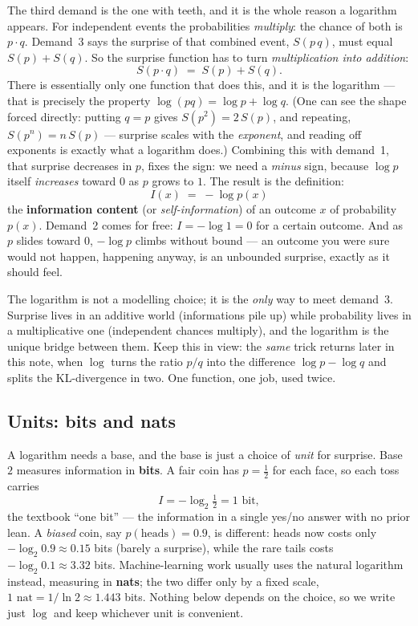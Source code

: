 \documentclass[11pt]{article}
\begin{document}
The third demand is the one with teeth, and it is the whole reason a logarithm appears. For
independent events the probabilities \emph{multiply}: the chance of both is $p \cdot q$. Demand~3
says the surprise of that combined event, $S(p\,q)$, must equal $S(p) + S(q)$. So the surprise
function has to turn \emph{multiplication into addition}:
\[
  S(p \cdot q) \;=\; S(p) + S(q).
\]
There is essentially only one function that does this, and it is the logarithm --- that is
precisely the property $\log(pq) = \log p + \log q$. (One can see the shape forced directly:
putting $q = p$ gives $S(p^2) = 2\,S(p)$, and repeating, $S(p^n) = n\,S(p)$ --- surprise scales
with the \emph{exponent}, and reading off exponents is exactly what a logarithm does.) Combining
this with demand~1, that surprise decreases in $p$, fixes the sign: we need a \emph{minus} sign,
because $\log p$ itself \emph{increases} toward $0$ as $p$ grows to $1$. The result is the
definition:
\[
  \boxed{\,I(x) \;=\; -\log p(x)\,}
\]
the \textbf{information content} (or \emph{self-information}) of an outcome $x$ of probability
$p(x)$. Demand~2 comes for free: $I = -\log 1 = 0$ for a certain outcome. And as $p$ slides
toward $0$, $-\log p$ climbs without bound --- an outcome you were sure would not happen,
happening anyway, is an unbounded surprise, exactly as it should feel.

\begin{insight}
The logarithm is not a modelling choice; it is the \emph{only} way to meet demand~3. Surprise
lives in an additive world (informations pile up) while probability lives in a multiplicative one
(independent chances multiply), and the logarithm is the unique bridge between them. Keep this in
view: the \emph{same} trick returns later in this note, when $\log$ turns the ratio $p/q$ into the
difference $\log p - \log q$ and splits the KL-divergence in two. One function, one job, used
twice.
\end{insight}

\subsection*{Units: bits and nats}

A logarithm needs a base, and the base is just a choice of \emph{unit} for surprise. Base $2$
measures information in \textbf{bits}. A fair coin has $p = \tfrac12$ for each face, so each toss
carries
\[
  I = -\log_2 \tfrac12 = 1 \text{ bit},
\]
the textbook ``one bit'' --- the information in a single yes/no answer with no prior lean. A
\emph{biased} coin, say $p(\text{heads}) = 0.9$, is different: heads now costs only
$-\log_2 0.9 \approx 0.15$ bits (barely a surprise), while the rare tails costs
$-\log_2 0.1 \approx 3.32$ bits. Machine-learning work usually uses the natural logarithm
instead, measuring in \textbf{nats}; the two differ only by a fixed scale, $1 \text{ nat} =
1/\!\ln 2 \approx 1.443$ bits. Nothing below depends on the choice, so we write just $\log$ and
keep whichever unit is convenient.
\end{document}
